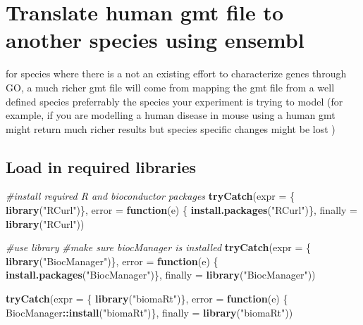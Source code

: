 \documentclass[
]{book}
\newenvironment{Shaded}{\begin{snugshade}}{\end{snugshade}}
\newcommand{\AttributeTok}[1]{\textcolor[rgb]{0.13,0.29,0.53}{#1}}
\newcommand{\CommentTok}[1]{\textcolor[rgb]{0.56,0.35,0.01}{\textit{#1}}}
\newcommand{\ControlFlowTok}[1]{\textcolor[rgb]{0.13,0.29,0.53}{\textbf{#1}}}
\newcommand{\FunctionTok}[1]{\textcolor[rgb]{0.13,0.29,0.53}{\textbf{#1}}}
\newcommand{\NormalTok}[1]{#1}
\newcommand{\SpecialCharTok}[1]{\textcolor[rgb]{0.81,0.36,0.00}{\textbf{#1}}}
\newcommand{\StringTok}[1]{\textcolor[rgb]{0.31,0.60,0.02}{#1}}
\begin{document}
\hypertarget{translate-human-gmt-file-to-another-species-using-ensembl}{%
\chapter{Translate human gmt file to another species using ensembl}\label{translate-human-gmt-file-to-another-species-using-ensembl}}

for species where there is a not an existing effort to characterize genes through GO, a much richer gmt file will come from mapping the gmt file from a well defined species preferrably the species your experiment is trying to model (for example, if you are modelling a human disease in mouse using a human gmt might return much richer results but species specific changes might be lost )

\hypertarget{load-in-required-libraries-1}{%
\section{Load in required libraries}\label{load-in-required-libraries-1}}

\begin{Shaded}
\begin{Highlighting}[]
\CommentTok{\#install required R and bioconductor packages}
\FunctionTok{tryCatch}\NormalTok{(}\AttributeTok{expr =}\NormalTok{ \{ }\FunctionTok{library}\NormalTok{(}\StringTok{"RCurl"}\NormalTok{)\}, }
         \AttributeTok{error =} \ControlFlowTok{function}\NormalTok{(e) \{  }
           \FunctionTok{install.packages}\NormalTok{(}\StringTok{"RCurl"}\NormalTok{)\}, }
         \AttributeTok{finally =} \FunctionTok{library}\NormalTok{(}\StringTok{"RCurl"}\NormalTok{))}

\CommentTok{\#use library}
\CommentTok{\#make sure biocManager is installed}
\FunctionTok{tryCatch}\NormalTok{(}\AttributeTok{expr =}\NormalTok{ \{ }\FunctionTok{library}\NormalTok{(}\StringTok{"BiocManager"}\NormalTok{)\}, }
         \AttributeTok{error =} \ControlFlowTok{function}\NormalTok{(e) \{ }
           \FunctionTok{install.packages}\NormalTok{(}\StringTok{"BiocManager"}\NormalTok{)\}, }
         \AttributeTok{finally =} \FunctionTok{library}\NormalTok{(}\StringTok{"BiocManager"}\NormalTok{))}


\FunctionTok{tryCatch}\NormalTok{(}\AttributeTok{expr =}\NormalTok{ \{ }\FunctionTok{library}\NormalTok{(}\StringTok{"biomaRt"}\NormalTok{)\}, }
         \AttributeTok{error =} \ControlFlowTok{function}\NormalTok{(e) \{ }
\NormalTok{           BiocManager}\SpecialCharTok{::}\FunctionTok{install}\NormalTok{(}\StringTok{"biomaRt"}\NormalTok{)\}, }
         \AttributeTok{finally =} \FunctionTok{library}\NormalTok{(}\StringTok{"biomaRt"}\NormalTok{))}
\end{Highlighting}
\end{Shaded}
\end{document}

